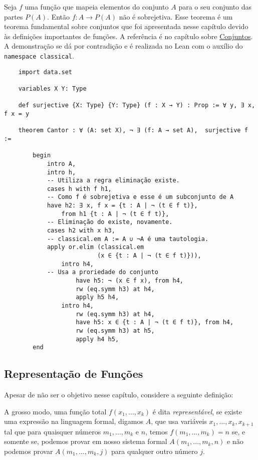 \begin{example}
    \label{cantor}
    Seja $f$ uma função que mapeia elementos do conjunto $A$ para o seu conjunto das partes $P(A)$. Então $f: A \to P(A)$ 
    não é sobrejetiva. 
    Esse teorema é um teorema fundamental sobre conjuntos que foi apresentada nesse capítulo devido às definições importantes
    de funções. A referência é no capítulo sobre \hyperlink{chapter.5}{Conjuntos}. A demonstração se dá por contradição e é realizada
    no Lean com o auxílio do \lstinline{namespace classical}. 

    \begin{lstlisting}
    import data.set

    variables X Y: Type 
    
    def surjective {X: Type} {Y: Type} (f : X → Y) : Prop := ∀ y, ∃ x, f x = y
    
    theorem Cantor : ∀ (A: set X), ¬ ∃ (f: A → set A),  surjective f :=
    
        begin
            intro A,
            intro h,
            -- Utiliza a regra eliminação existe.
            cases h with f h1,
            -- Como f é sobrejetiva e esse é um subconjunto de A            
            have h2: ∃ x, f x = {t : A | ¬ (t ∈ f t)},  
                from h1 {t : A | ¬ (t ∈ f t)},
            -- Eliminação do existe, novamente. 
            cases h2 with x h3,
            -- classical.em A := A ∪ ¬A é uma tautologia. 
            apply or.elim (classical.em 
                          (x ∈ {t : A | ¬ (t ∈ f t)})),
                intro h4,
            -- Usa a proriedade do conjunto
                    have h5: ¬ (x ∈ f x), from h4,
                    rw (eq.symm h3) at h4, 
                    apply h5 h4,
                intro h4,
                    rw (eq.symm h3) at h4,
                    have h5: x ∈ {t : A | ¬ (t ∈ f t)}, from h4,
                    rw (eq.symm h3) at h5,
                    apply h4 h5,                     
        end   
    \end{lstlisting}
\end{example}

\subsection{Representação de Funções}

Apesar de não ser o objetivo nesse capítulo, considere a seguinte definição: 

\begin{definition}
    \label{represent}
    A grosso modo, uma função total $f(x_1, ..., x_k)$ é dita
    \textit{representável}, se existe uma expressão na linguagem formal,
    digamos $A$, que usa variáveis $x_1, ..., x_k, x_{k+1}$ tal que para
    quaisquer números $m_1,...,m_k$ e $n$, temos $f(m_1,...,m_k) = n$ se, e
    somente se, podemos provar em nosso sistema formal $A(m_1,...,m_k,n)$ e
    não podemos provar $A(m_1,...,m_k,j)$ para qualquer outro número $j$.
\end{definition}

